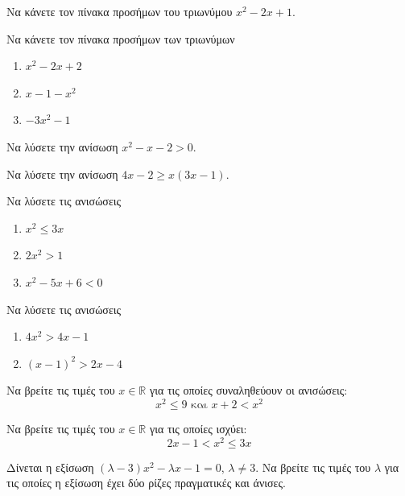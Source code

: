 \documentclass{../../presentation}
\begin{document}
\begin{askisi}
  Να κάνετε τον πίνακα προσήμων του τριωνύμου $x^2-2x+1$.
\end{askisi}

\begin{askisi}
  Να κάνετε τον πίνακα προσήμων των τριωνύμων
  \begin{enumerate}[<+->]
    \item $x^2-2x+2$
    \item $x-1-x^2$
    \item $-3x^2-1$
  \end{enumerate}
\end{askisi}

\begin{askisi}
  Να λύσετε την ανίσωση $x^2-x-2>0$.
\end{askisi}

\begin{askisi}
  Να λύσετε την ανίσωση $4x-2\ge x(3x-1)$.
\end{askisi}

\begin{askisi}
  Να λύσετε τις ανισώσεις
  \begin{enumerate}[<+->]
    \item $x^2\le 3x$
    \item $2x^2>1$
    \item $x^2-5x+6<0$
  \end{enumerate}
\end{askisi}

\begin{askisi}
  Να λύσετε τις ανισώσεις
  \begin{enumerate}[<+->]
    \item $4x^2>4x-1$
    \item $(x-1)^2>2x-4$
  \end{enumerate}
\end{askisi}

\begin{askisi}
  Να βρείτε τις τιμές του $x\in\mathbb{R}$ για τις οποίες συναληθεύουν οι ανισώσεις:
  $$x^2\le 9 \text{ και } x+2<x^2$$
\end{askisi}

\begin{askisi}
  Να βρείτε τις τιμές του $x\in\mathbb{R}$ για τις οποίες ισχύει:
  $$2x-1<x^2\le 3x$$
\end{askisi}

\begin{askisi}
  Δίνεται η εξίσωση $(λ-3)x^2-λx-1=0$, $λ\ne 3$. Να βρείτε τις τιμές του $λ$ για τις οποίες η εξίσωση έχει δύο ρίζες πραγματικές και άνισες.
\end{askisi}
\end{document}

